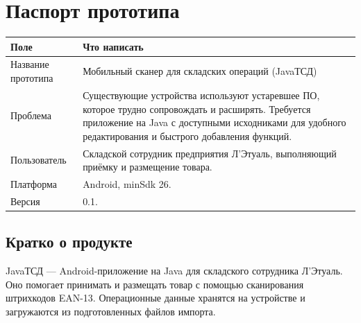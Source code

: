 \section{Паспорт прототипа}

\begin{tabularx}{\textwidth}{L{48mm}Y}
\toprule
\textbf{Поле} & \textbf{Что написать} \\
\midrule
Название прототипа & Мобильный сканер для складских операций (JavaТСД) \\
Проблема & Существующие устройства используют устаревшее ПО, которое трудно сопровождать и расширять. Требуется приложение на Java с доступными исходниками для удобного редактирования и быстрого добавления функций. \\
Пользователь & Складской сотрудник предприятия Л'Этуаль, выполняющий приёмку и размещение товара. \\
Платформа & Android, minSdk 26. \\
Версия & 0.1. \\
\bottomrule
\end{tabularx}

\subsection{Кратко о продукте}

JavaТСД --- Android-приложение на Java для складского сотрудника Л'Этуаль. Оно помогает принимать и размещать товар с помощью сканирования штрихкодов EAN-13. Операционные данные хранятся на устройстве и загружаются из подготовленных файлов импорта.
